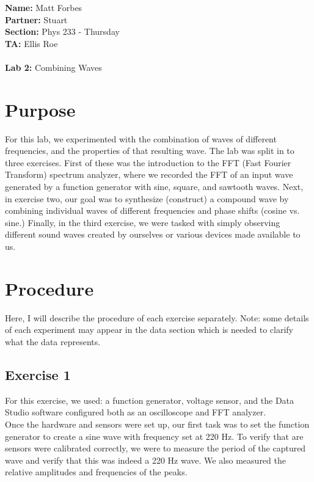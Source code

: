 \documentclass[a4paper,12pt]{article}
\begin{document}
{\bf Name:} Matt Forbes \\
{\bf Partner:} Stuart  \\ 
{\bf Section:} Phys 233 - Thursday \\
{\bf TA:} Ellis Roe  \\ \\ 
{\bf Lab 2:} Combining Waves \\

\section{Purpose}
For this lab, we experimented with the combination of waves of
different frequencies, and the properties of that resulting wave. The
lab was split in to three exercises. First of these was the
introduction to the FFT (Fast Fourier Transform) spectrum analyzer,
where we recorded the FFT of an input wave generated by a function
generator with sine, square, and sawtooth waves. Next, in exercise
two, our goal was to synthesize (construct) a compound wave by
combining individual waves of different frequencies and phase shifts
(cosine vs. sine.) Finally, in the third exercise, we were tasked with
simply observing different sound waves created by ourselves or various
devices made available to us. 

\section{Procedure}
Here, I will describe the procedure of each exercise separately. Note:
some details of each experiment may appear in the data section which
is needed to clarify what the data represents.

\subsection{Exercise 1}
For this exercise, we used: a function generator, voltage sensor, and
the Data Studio software configured both as an oscilloscope and FFT
analyzer. \\

Once the hardware and sensors were set up, our first task
was to set the function generator to create a sine wave with frequency
set at 220 Hz. To verify that are sensors were calibrated correctly,
we were to measure the period of the captured wave and verify that
this was indeed a 220 Hz wave. We also measured the relative
amplitudes and frequencies of the peaks. \\
\end{document}
